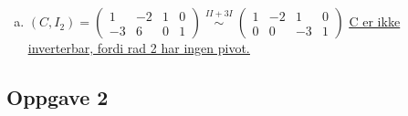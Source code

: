 \documentclass{article}
\newcommand{\uu}[1]{\underline{\underline{#1}}}
\newcommand{\eqqto}[1]{\overset{\substack{#1}}{\sim}}
\begin{document}
\begin{enumerate}[a)]
    \item \( (C, I_2) = 
    \begin{pmatrix}
        1&-2&1&0 \\
        -3&6&0&1
    \end{pmatrix}
    \eqqto{II+3I}
    \begin{pmatrix}
        1&-2&1&0 \\
        0&0&-3&1
    \end{pmatrix}
    \)
    \qquad
    \uu{C er ikke inverterbar, fordi rad 2 har ingen pivot.}
\end{enumerate}

\vspace{2em}
\subsection*{Oppgave 2}
\end{document}
